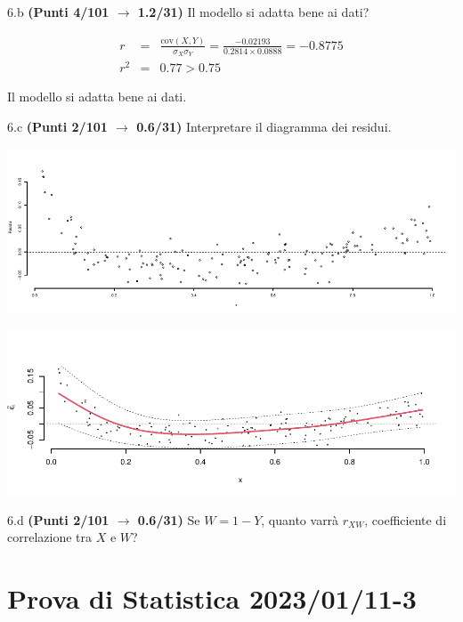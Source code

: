 \documentclass[
  11pt,
]{book}
\theoremstyle{mytheoremstyle}
\theoremstyle{mydefstyle}
\newenvironment{sol}
  {
  \begin{tcolorbox}[enhanced,breakable,arc=0.1mm,boxrule=1pt,colback=white,colframe=iblue,
  title=\bf \fontfamily{lmss}\selectfont \hspace{.5 cm} Soluzione,drop fuzzy shadow]

}{
\end{tcolorbox}
  }
\begin{document}
6.b \textbf{(Punti 4/101 \(\rightarrow\) 1.2/31)} Il modello si adatta bene ai dati?

\begin{sol}
\begin{eqnarray*}
r&=&\frac{\text{cov}(X,Y)}{\sigma_X\sigma_Y}=\frac{ -0.02193 }{ 0.2814 \times 0.0888 }= -0.8775 \\ 
r^2&=& 0.77 > 0.75
\end{eqnarray*}

Il modello si adatta bene ai dati.

\end{sol}

6.c \textbf{(Punti 2/101 \(\rightarrow\) 0.6/31)} Interpretare il diagramma dei residui.

\begin{center}\includegraphics{Esami_passati_con_soluzioni_files/figure-latex/2023-122-1} \end{center}

\begin{sol}

\begin{center}\includegraphics{Esami_passati_con_soluzioni_files/figure-latex/2023-10,-1} \end{center}

\end{sol}

6.d \textbf{(Punti 2/101 \(\rightarrow\) 0.6/31)} Se \(W= 1 - Y\), quanto varrà \(r_{XW}\), coefficiente di correlazione tra \(X\) e \(W\)?

\section{Prova di Statistica 2023/01/11-3}\label{prova-di-statistica-20230111-3}
\end{document}
